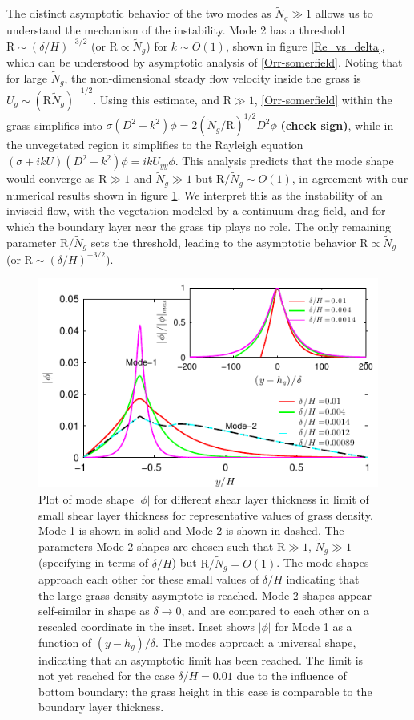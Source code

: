 \documentclass[aps,prl,reprint,twocolumn,showpacs,superscriptaddress,10pt]{revtex4-1}  %
\newcommand{\hg}{h_g}
\newcommand{\Rey}{\text{R}}
\newcommand{\Ndg}{\tilde{N}_g}
\newcommand{\shreyas}[1]{{\bf (#1)}}
\begin{document}
The distinct asymptotic behavior of the two modes as $\Ndg \gg 1$ allows us to understand the mechanism of the instability. 
Mode 2 has a threshold $\Rey \sim ({\delta}/{H})^{-3/2}$ (or $\Rey \propto \Ndg$) for $k\sim O(1)$, shown in figure \ref{Re_vs_delta}, which can be understood by asymptotic analysis of \eqref{Orr-somerfield}.
Noting that for large $\Ndg$, the non-dimensional steady flow velocity inside the grass is $U_g \sim (\Rey \Ndg)^{-1/2}$. 
Using this estimate, and $\Rey\gg1$, \eqref{Orr-somerfield} within the grass simplifies into $\sigma\left(D^2-k^2\right)\phi = 2{(\Ndg/\Rey)^{1/2}}D^2\phi$ \shreyas{check sign}, while in the unvegetated region it simplifies to the Rayleigh equation $ \left(\sigma+ikU\right) \left(D^2-k^2\right)\phi =  ikU_{yy}\phi$. 
This analysis predicts that the mode shape would converge as $\Rey\gg 1$ and $\Ndg \gg 1$ but $\Rey/\Ndg \sim O(1)$, in agreement with our numerical results shown in figure \ref{Asymptotic_mode}. 
We interpret this as the instability of an inviscid flow, with the vegetation modeled by a continuum drag field, and for which the boundary layer near the grass tip plays no role. The only remaining parameter $\Rey/\Ndg$ sets the threshold, leading to the asymptotic behavior $\Rey \propto \Ndg$ (or $\Rey \sim ({\delta}/{H})^{-3/2}$).


\begin{figure}
\includegraphics[]{Asymptotic_noshear}
\caption{Plot of mode shape $|\phi|$ for different shear layer thickness in limit of small shear layer thickness for representative values of grass density. Mode 1 is shown in solid and Mode 2 is shown in dashed. The parameters Mode 2 shapes are chosen such that $\Rey \gg 1$, $\Ndg \gg 1$ (specifying in terms of $\delta/H$) but $\Rey/\Ndg = O(1)$. The mode shapes approach each other for these small values of $\delta/H$ indicating that the large grass density asymptote is reached. Mode 2 shapes appear self-similar in shape as $\delta\to 0$, and are compared to each other on a rescaled coordinate in the inset. Inset shows $|\phi|$ for Mode 1 as a function of $(y-\hg)/\delta$. The modes approach a universal shape, indicating that an asymptotic limit has been reached. The limit is not yet reached for the case $\delta/H = 0.01$ due to the influence of bottom boundary; the grass height in this case is comparable to the boundary layer thickness.}
\label{Asymptotic_mode}
\end{figure}
\end{document}
